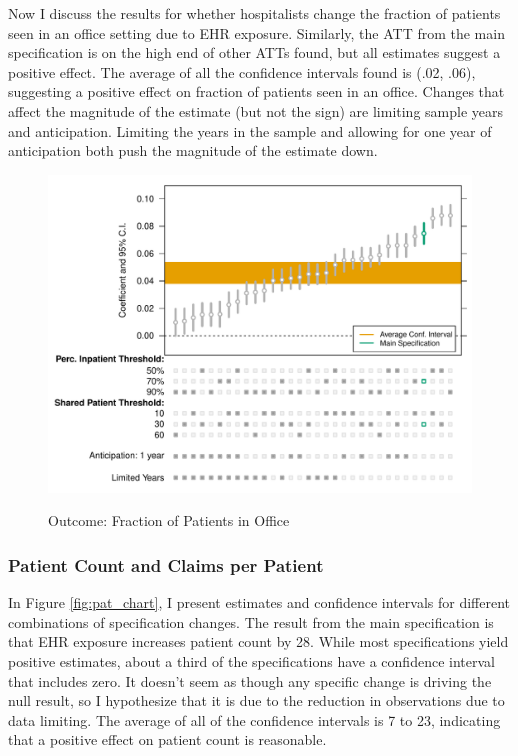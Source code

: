\documentclass[12pt]{article}
\begin{document}
Now I discuss the results for whether hospitalists change the fraction of patients seen in an office setting due to EHR exposure. Similarly, the ATT from the main specification is on the high end of other ATTs found, but all estimates suggest a positive effect. The average of all the confidence intervals found is (.02, .06), suggesting a positive effect on fraction of patients seen in an office. Changes that affect the magnitude of the estimate (but not the sign) are limiting sample years and anticipation. Limiting the years in the sample and allowing for one year of anticipation both push the magnitude of the estimate down. 

\begin{figure}[ht]
    \caption{Outcome: Fraction of Patients in Office}
    \includegraphics[scale=.7]{Objects/office_frac_chart.pdf}
    \label{fig:fracoffice_chart}
\end{figure}


\subsubsection{Patient Count and Claims per Patient}

In Figure \ref{fig:pat_chart}, I present estimates and confidence intervals for different combinations of specification changes. The result from the main specification is that EHR exposure increases patient count by 28. While most specifications yield positive estimates, about a third of the specifications have a confidence interval that includes zero. It doesn't seem as though any specific change is driving the null result, so I hypothesize that it is due to the reduction in observations due to data limiting. The average of all of the confidence intervals is 7 to 23, indicating that a positive effect on patient count is reasonable. 
\end{document}
